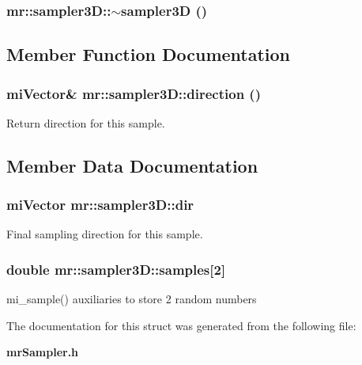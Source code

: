 \subsubsection{\setlength{\rightskip}{0pt plus 5cm}mr::sampler3D::$\sim${\bf sampler3D} ()\hspace{0.3cm}{\tt  [inline]}}\label{structmr_1_1sampler3D_a2}




\subsection{Member Function Documentation}
\subsubsection{\setlength{\rightskip}{0pt plus 5cm}mi\-Vector\& mr::sampler3D::direction ()\hspace{0.3cm}{\tt  [inline]}}\label{structmr_1_1sampler3D_a3}


Return direction for this sample. 



\subsection{Member Data Documentation}
\subsubsection{\setlength{\rightskip}{0pt plus 5cm}mi\-Vector {\bf mr::sampler3D::dir}}\label{structmr_1_1sampler3D_o1}


Final sampling direction for this sample. 

\subsubsection{\setlength{\rightskip}{0pt plus 5cm}double {\bf mr::sampler3D::samples}[2]}\label{structmr_1_1sampler3D_o0}


mi\_\-sample() auxiliaries to store 2 random numbers 



The documentation for this struct was generated from the following file:\begin{CompactItemize}
\item 
{\bf mr\-Sampler.h}\end{CompactItemize}
